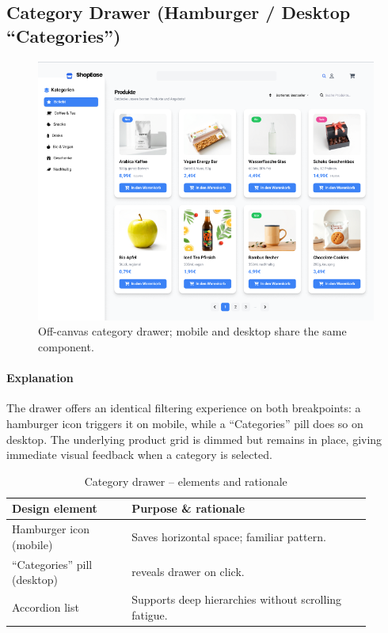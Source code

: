\documentclass[11pt,a4paper]{article}
\begin{document}
\subsection{Category Drawer (Hamburger / Desktop “Categories”)}

\begin{figure}[H]
	\centering
	\includegraphics[width=\linewidth]{pictures/main/categories_Figma}%
	\caption{Off-canvas category drawer; mobile and desktop share the same component.}
	\label{fig:ui-category-drawer}
\end{figure}

\paragraph{Explanation}%
The drawer offers an identical filtering experience on both breakpoints:
a hamburger icon triggers it on mobile, while a “Categories” pill does so on
desktop. The underlying product grid is dimmed but remains in place, giving
immediate visual feedback when a category is selected.

\begin{table}[H]
	\centering
	\caption{Category drawer – elements and rationale}
	\label{tab:category-elements}
	\begin{tabular}{p{0.30\linewidth} p{0.60\linewidth}}
		\toprule
		\textbf{Design element} & \textbf{Purpose \& rationale} \\ \midrule

		Hamburger icon (mobile) & Saves horizontal space; familiar pattern. \\
		“Categories” pill (desktop) & reveals drawer on click. \\
		Accordion list          & Supports deep hierarchies without scrolling fatigue. \\
	
		\bottomrule
	\end{tabular}
\end{table}
\end{document}
